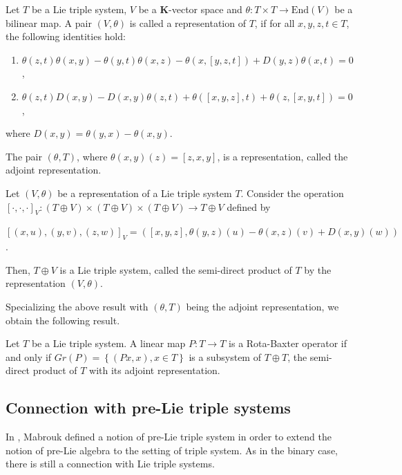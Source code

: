 \documentclass[11pt, twoside]{article}
\begin{document}
\begin{defi}
    Let $T$ be a Lie triple system, $V$ be a $\mathbf{K}$-vector space and $\theta:T\times T\to \mathrm{End}(V) $ be a bilinear map. A pair $(V,\theta)$ is called a representation of $T$, if for all $x,y,z,t\in T$, the following identities hold:
           \begin{enumerate}
           \item 
               $\theta(z,t)\theta(x,y)-\theta(y,t)\theta(x,z)-\theta(x,[y,z,t]) + D(y,z)\theta(x,t)=0$,
           \item $\theta(z,t)D(x,y)-D(x,y)\theta(z,t)+\theta([x,y,z],t)+ \theta(z,[x,y,t])=0$ ,
          \end{enumerate} where $D(x,y)=\theta(y,x)-\theta(x,y) $.
\end{defi}

\begin{ex}
    The pair $(\theta,T)$, where $\theta(x,y)(z)=[z,x,y] $, is a representation, called the adjoint representation.
\end{ex}

\begin{prop}
    Let $(V,\theta)$ be a representation of a Lie triple system $T$. Consider the operation $[\cdot,\cdot,\cdot]_V: (T\oplus V)\times (T\oplus V)\times (T\oplus V)\to T\oplus V  $ defined by \begin{center}
        $[(x,u),(y,v),(z,w)]_V=([x,y,z], \theta(y,z)(u)-\theta(x,z)(v)+ D(x,y)(w)) $.
    \end{center} Then, $T\oplus V$ is a Lie triple system, called the semi-direct product of $T$ by the representation $(V,\theta)$.
\end{prop}

Specializing the above result with $(\theta,T) $ being the adjoint representation, we obtain the following result. 

\begin{prop}
    Let $T$ be a Lie triple system. A linear map $P:T\to T$ is a Rota-Baxter operator if and only if $Gr(P)=  \left\{ (Px,x), x\in T\right\}  $ is a subsystem of $T\oplus T$, the semi-direct product of $T$ with its adjoint representation.
\end{prop}


\subsection{Connection with pre-Lie triple systems}

In \cite{M21}, Mabrouk defined a notion of pre-Lie triple system in order to extend the notion of pre-Lie algebra to the setting of triple system. As in the binary case, there is still a connection with Lie triple systems.
\end{document}
